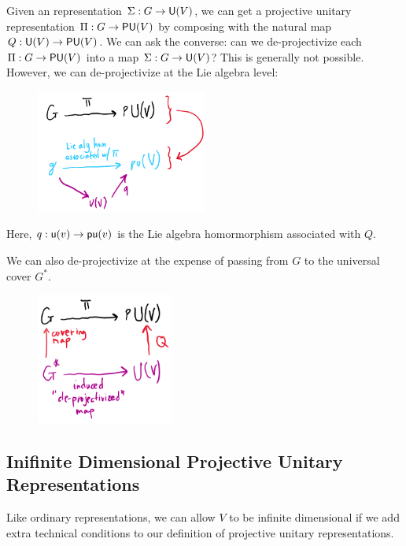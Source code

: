 Given an representation $\Sigma: G \rightarrow \operatorname{\textsf{U}}(V)$, we can get a projective unitary representation $\Pi: G \rightarrow \operatorname{\textsf{PU}}(V)$ by composing with the natural map $Q: \operatorname{\textsf{U}}(V) \rightarrow \operatorname{\textsf{PU}}(V)$. We can ask the converse: can we de-projectivize each $\Pi: G \rightarrow \operatorname{\textsf{PU}}(V)$ into a map $\Sigma: G \rightarrow \operatorname{\textsf{U}}(V)$? This is generally not possible. However, we can de-projectivize at the Lie algebra level:
\begin{figure}[H]
    \includegraphics[width=0.5\textwidth]{figures/de-projectivization}
    \centering
\end{figure}

Here, $q: \operatorname{\textsf{u}}(v) \rightarrow \operatorname{\textsf{pu}}(v)$ is the Lie algebra homormorphism associated with $Q$.

We can also de-projectivize at the expense of passing from $G$ to the universal cover $G^*$.
\begin{figure}[H]
    \includegraphics[width=0.4\textwidth]{figures/de-projectivization2}
    \centering
\end{figure}

\subsection{Inifinite Dimensional Projective Unitary Representations}
Like ordinary representations, we can allow $V$ to be infinite dimensional if we add extra technical conditions to our definition of projective unitary representations.
